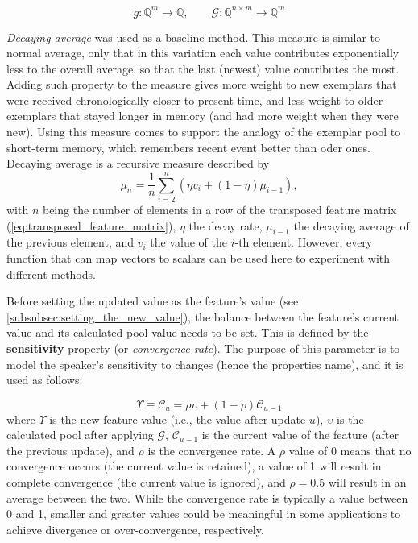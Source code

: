 \begin{equation}
	\label{eq:matrix2vec}
	g: \mathbb{Q}^{m} \longrightarrow \mathbb{Q}, \qquad \mathcal{G}: \mathbb{Q}^{n \times m} \longrightarrow \mathbb{Q}^{m} 
\end{equation}

\textit{Decaying average} was used as a baseline method.
This measure is similar to normal average, only that in this variation each value contributes exponentially less to the overall average, so that the last (newest) value contributes the most.
Adding such property to the measure gives more weight to new exemplars that were received chronologically closer to present time, and less weight to older exemplars that stayed longer in memory (and had more weight when they were new).
Using this measure comes to support the analogy of the exemplar pool to short-term memory, which remembers recent event better than oder ones.
Decaying average is a recursive measure described by
\begin{equation}
\label{eq:decaying_average}
\mu_n = \frac{1}{n}\sum_{i = 2}^{n}(\eta v_i + (1 - \eta )\mu_{i-1}),
\end{equation}
%
with $n$ being the number of elements in a row of the transposed feature matrix (\cref{eq:transposed_feature_matrix}), $\eta$ the decay rate, $\mu_{i-1}$ the decaying average of the previous element, and $v_i$ the value of the $i$-th element.
However, every function that can map vectors to scalars can be used here to experiment with different methods.

Before setting the updated value as the feature's value (see \cref{subsubsec:setting_the_new_value}), the balance between the feature's current value and its calculated pool value needs to be set.
This is defined by the \textbf{sensitivity} property (or \textit{convergence rate}).
The purpose of this parameter is to model the speaker's sensitivity to changes (hence the properties name), and it is used as follows:

\begin{equation}
\Upsilon \equiv \mathcal{C}_u = \rho \upsilon + \left(1 - \rho \right) \mathcal{C}_{u-1} 
\label{eq:convergence_rate}
\end{equation}
\noindent
where $\Upsilon$ is the new feature value (i.e., the value after update $u$), $\upsilon$ is the calculated pool after applying $\mathcal{G}$, $\mathcal{C}_{u-1}$ is the current value of the feature (after the previous update), and $\rho$ is the convergence rate.
A $\rho$ value of 0 means that no convergence occurs (the current value is retained), a value of 1 will result in complete convergence (the current value is ignored), and $\rho=0.5$ will result in an average between the two.
While the convergence rate is typically a value between 0 and 1, smaller and greater values could be meaningful in some applications to achieve divergence or over-convergence, respectively.

